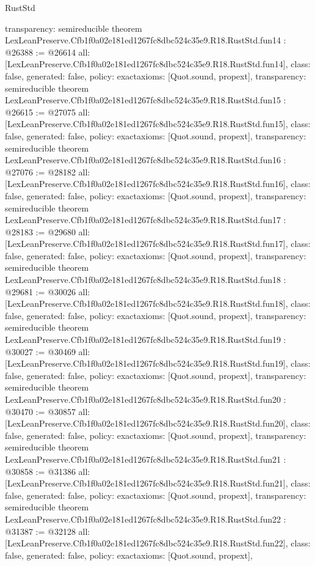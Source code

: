 \begin{lexlean}{RustStd}
\begin{coremodule}
{  transparency: semireducible
}
theorem LexLeanPreserve.Cfb1f0a02e181ed1267fc8dbc524c35e9.R18.RustStd.fun14 : @26388 := @26614 {
  all: [LexLeanPreserve.Cfb1f0a02e181ed1267fc8dbc524c35e9.R18.RustStd.fun14],
  class: false,
  generated: false,
  policy: exact{axioms: [Quot.sound, propext]},
  transparency: semireducible
}
theorem LexLeanPreserve.Cfb1f0a02e181ed1267fc8dbc524c35e9.R18.RustStd.fun15 : @26615 := @27075 {
  all: [LexLeanPreserve.Cfb1f0a02e181ed1267fc8dbc524c35e9.R18.RustStd.fun15],
  class: false,
  generated: false,
  policy: exact{axioms: [Quot.sound, propext]},
  transparency: semireducible
}
theorem LexLeanPreserve.Cfb1f0a02e181ed1267fc8dbc524c35e9.R18.RustStd.fun16 : @27076 := @28182 {
  all: [LexLeanPreserve.Cfb1f0a02e181ed1267fc8dbc524c35e9.R18.RustStd.fun16],
  class: false,
  generated: false,
  policy: exact{axioms: [Quot.sound, propext]},
  transparency: semireducible
}
theorem LexLeanPreserve.Cfb1f0a02e181ed1267fc8dbc524c35e9.R18.RustStd.fun17 : @28183 := @29680 {
  all: [LexLeanPreserve.Cfb1f0a02e181ed1267fc8dbc524c35e9.R18.RustStd.fun17],
  class: false,
  generated: false,
  policy: exact{axioms: [Quot.sound, propext]},
  transparency: semireducible
}
theorem LexLeanPreserve.Cfb1f0a02e181ed1267fc8dbc524c35e9.R18.RustStd.fun18 : @29681 := @30026 {
  all: [LexLeanPreserve.Cfb1f0a02e181ed1267fc8dbc524c35e9.R18.RustStd.fun18],
  class: false,
  generated: false,
  policy: exact{axioms: [Quot.sound, propext]},
  transparency: semireducible
}
theorem LexLeanPreserve.Cfb1f0a02e181ed1267fc8dbc524c35e9.R18.RustStd.fun19 : @30027 := @30469 {
  all: [LexLeanPreserve.Cfb1f0a02e181ed1267fc8dbc524c35e9.R18.RustStd.fun19],
  class: false,
  generated: false,
  policy: exact{axioms: [Quot.sound, propext]},
  transparency: semireducible
}
theorem LexLeanPreserve.Cfb1f0a02e181ed1267fc8dbc524c35e9.R18.RustStd.fun20 : @30470 := @30857 {
  all: [LexLeanPreserve.Cfb1f0a02e181ed1267fc8dbc524c35e9.R18.RustStd.fun20],
  class: false,
  generated: false,
  policy: exact{axioms: [Quot.sound, propext]},
  transparency: semireducible
}
theorem LexLeanPreserve.Cfb1f0a02e181ed1267fc8dbc524c35e9.R18.RustStd.fun21 : @30858 := @31386 {
  all: [LexLeanPreserve.Cfb1f0a02e181ed1267fc8dbc524c35e9.R18.RustStd.fun21],
  class: false,
  generated: false,
  policy: exact{axioms: [Quot.sound, propext]},
  transparency: semireducible
}
theorem LexLeanPreserve.Cfb1f0a02e181ed1267fc8dbc524c35e9.R18.RustStd.fun22 : @31387 := @32128 {
  all: [LexLeanPreserve.Cfb1f0a02e181ed1267fc8dbc524c35e9.R18.RustStd.fun22],
  class: false,
  generated: false,
  policy: exact{axioms: [Quot.sound, propext]},
}
\end{coremodule}
\end{lexlean}
